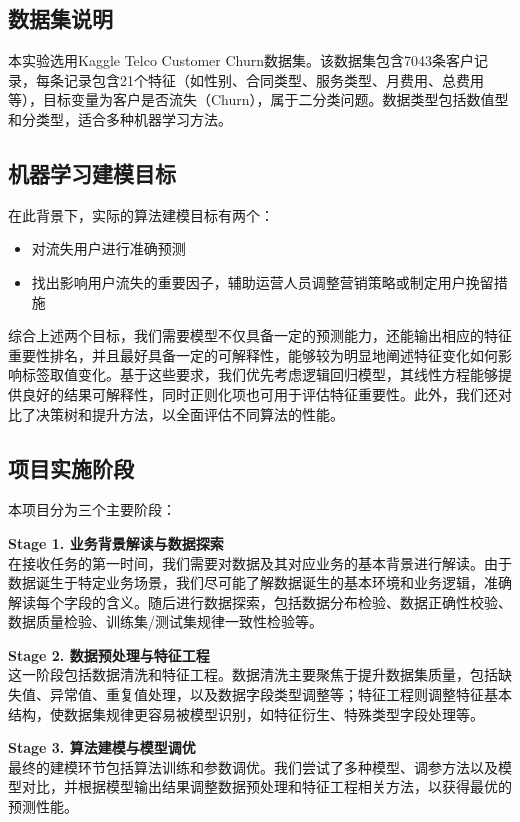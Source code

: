 \documentclass{article}
\begin{document}
\subsection{数据集说明}
本实验选用Kaggle Telco Customer Churn数据集。该数据集包含7043条客户记录，每条记录包含21个特征（如性别、合同类型、服务类型、月费用、总费用等），目标变量为客户是否流失（Churn），属于二分类问题。数据类型包括数值型和分类型，适合多种机器学习方法。

\subsection{机器学习建模目标}
在此背景下，实际的算法建模目标有两个：
\begin{itemize}
    \item 对流失用户进行准确预测
    \item 找出影响用户流失的重要因子，辅助运营人员调整营销策略或制定用户挽留措施
\end{itemize}

综合上述两个目标，我们需要模型不仅具备一定的预测能力，还能输出相应的特征重要性排名，并且最好具备一定的可解释性，能够较为明显地阐述特征变化如何影响标签取值变化。基于这些要求，我们优先考虑逻辑回归模型，其线性方程能够提供良好的结果可解释性，同时正则化项也可用于评估特征重要性。此外，我们还对比了决策树和提升方法，以全面评估不同算法的性能。

\subsection{项目实施阶段}
本项目分为三个主要阶段：

\textbf{Stage 1. 业务背景解读与数据探索}\\
在接收任务的第一时间，我们需要对数据及其对应业务的基本背景进行解读。由于数据诞生于特定业务场景，我们尽可能了解数据诞生的基本环境和业务逻辑，准确解读每个字段的含义。随后进行数据探索，包括数据分布检验、数据正确性校验、数据质量检验、训练集/测试集规律一致性检验等。

\textbf{Stage 2. 数据预处理与特征工程}\\
这一阶段包括数据清洗和特征工程。数据清洗主要聚焦于提升数据集质量，包括缺失值、异常值、重复值处理，以及数据字段类型调整等；特征工程则调整特征基本结构，使数据集规律更容易被模型识别，如特征衍生、特殊类型字段处理等。

\textbf{Stage 3. 算法建模与模型调优}\\
最终的建模环节包括算法训练和参数调优。我们尝试了多种模型、调参方法以及模型对比，并根据模型输出结果调整数据预处理和特征工程相关方法，以获得最优的预测性能。
\end{document}
